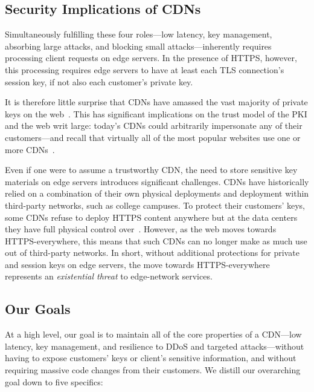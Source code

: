 \subsection{Security Implications of CDNs} %

Simultaneously fulfilling these four roles---low latency, key
management, absorbing large attacks, and blocking small
attacks---inherently requires processing client requests on
edge servers.
%
In the presence of HTTPS, however, this processing requires
edge servers to have at least each TLS connection's session key, if not
also each customer's private key.

It is therefore little surprise that CDNs have amassed the vast
majority of private keys on the
web~\cite{key-sharing,when-https-meets-cdn}.
%
This has significant implications on the trust model of the PKI and the
web writ large: today's CDNs could arbitrarily impersonate any of their
customers---and recall that virtually all of the most popular websites
use one or more CDNs~\cite{key-sharing}.

Even if one were to assume a trustworthy CDN, the need to store
sensitive key materials on edge servers introduces significant
challenges.
%
CDNs have historically relied on a combination of their own physical
deployments and deployment within third-party networks, such as college
campuses.
%
To protect their customers' keys, some CDNs refuse to deploy
HTTPS content anywhere but at the data centers they have full physical
control over~\cite{securing-cdns}.
%
However, as the web moves towards HTTPS-everywhere, this means that
such CDNs can no longer make as much use out of third-party networks.
%
In short, without additional protections for private and session keys
on edge servers, the move towards HTTPS-everywhere represents an
\emph{existential threat} to edge-network services.


\subsection{Our Goals} %
\label{sec:goals}

At a high level, our goal is to maintain all of the core properties of
a CDN---low latency, key management, and resilience to DDoS and
targeted attacks---without having to expose customers' keys or client's
sensitive information, and without requiring massive code changes from
their customers.
%
We distill our overarching goal down to five specifics:

